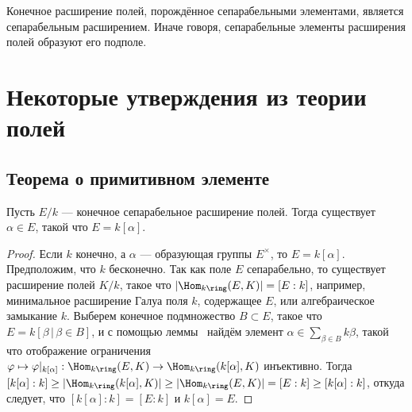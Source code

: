 \documentclass[
	extrafontsizes,
	11pt,
	hyphens,
]{memoir}
\begin{document}
\begin{corollary}
Конечное расширение полей, порождённое сепарабельными элементами, является сепарабельным расширением.
Иначе говоря, сепарабельные элементы расширения полей образуют его подполе.
\end{corollary}


\section{Некоторые утверждения из теории полей}

\subsection{Теорема о примитивном элементе}


\begin{theorem}
Пусть \(E/k\) --- конечное сепарабельное расширение полей. Тогда существует \(\alpha \in E\), такой что \(E = k[\alpha]\). 
\end{theorem}

\begin{proof}
Если \(k\) конечно, а \(\alpha\) --- образующая группы \(E^{\times}\), то \(E = k[\alpha]\).
Предположим, что \(k\) бесконечно.
Так как поле \(E\) сепарабельно, то существует расширение полей \(K/k\), такое что \(\lvert \Hom_{k\ring}(E, K) \rvert = [E : k]\), например, минимальное расширение Галуа поля \(k\), содержащее \(E\), или алгебраическое замыкание \(k\).
Выберем конечное подмножество \(B \subset E\), такое что \(E = k[\beta \,|\, \beta \in B]\),
и с помощью леммы~ найдём элемент
\(\alpha \in \sum_{\beta \in B} k \beta\),
такой что отображение ограничения
\(\varphi \mapsto \varphi|_{k[\alpha]} : \Hom_{k\ring}(E, K) \to \Hom_{k\ring}(k[\alpha], K)\)
инъективно.
Тогда
\([k[\alpha] : k] \geq \lvert \Hom_{k\ring}(k[\alpha], K) \rvert \geq \lvert \Hom_{k\ring}(E, K) \rvert = [E : k] \geq [k[\alpha] : k]\),
откуда следует, что \([k[\alpha] : k] = [E : k]\) и \(k[\alpha] = E\).
\end{proof}
\end{document}
